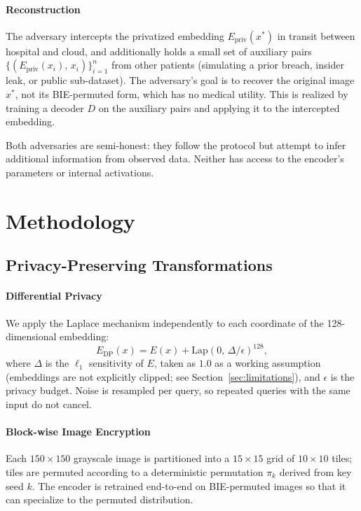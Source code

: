 \documentclass[conference]{IEEEtran}
\begin{document}
\paragraph{Reconstruction} The adversary intercepts the privatized embedding $E_{\mathrm{priv}}(x^*)$ in transit between hospital and cloud, and additionally holds a small set of auxiliary pairs $\{(E_{\mathrm{priv}}(x_i),\, x_i)\}_{i=1}^{n}$ from other patients (simulating a prior breach, insider leak, or public sub-dataset). The adversary's goal is to recover the  {original} image $x^*$, not its BIE-permuted form, which has no medical utility. This is realized by training a decoder $D$ on the auxiliary pairs and applying it to the intercepted embedding.

Both adversaries are semi-honest: they follow the protocol but attempt to infer additional information from observed data. Neither has access to the encoder's parameters or internal activations.

\section{Methodology}
\label{sec:methodology}

\subsection{Privacy-Preserving Transformations}
\paragraph{Differential Privacy} We apply the Laplace mechanism \cite{dwork} independently to each coordinate of the 128-dimensional embedding:
\begin{equation}
  E_{\mathrm{DP}}(x) = E(x) + \mathrm{Lap}(0,\, \Delta/\epsilon)^{128},\label{eq:dp}
\end{equation}
where $\Delta$ is the $\ell_1$ sensitivity of $E$, taken as $1.0$ as a working assumption (embeddings are not explicitly clipped; see Section~\ref{sec:limitations}), and $\epsilon$ is the privacy budget. Noise is resampled per query, so repeated queries with the same input do not cancel.

\paragraph{Block-wise Image Encryption} Each $150{\times}150$ grayscale image is partitioned into a $15{\times}15$ grid of $10{\times}10$ tiles; tiles are permuted according to a deterministic permutation $\pi_k$ derived from key seed $k$. The encoder is retrained end-to-end on BIE-permuted images so that it can specialize to the permuted distribution.
\end{document}
